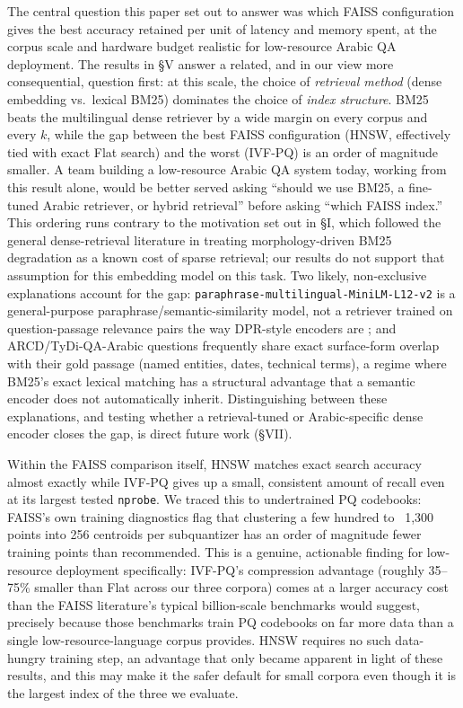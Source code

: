 \documentclass[conference]{IEEEtran}
\begin{document}
The central question this paper set out to answer was which FAISS configuration gives the best accuracy retained per unit of latency and memory spent, at the corpus scale and hardware budget realistic for low-resource Arabic QA deployment. The results in \S V answer a related, and in our view more consequential, question first: at this scale, the choice of \emph{retrieval method} (dense embedding vs.\ lexical BM25) dominates the choice of \emph{index structure}. BM25 beats the multilingual dense retriever by a wide margin on every corpus and every $k$, while the gap between the best FAISS configuration (HNSW, effectively tied with exact Flat search) and the worst (IVF-PQ) is an order of magnitude smaller. A team building a low-resource Arabic QA system today, working from this result alone, would be better served asking ``should we use BM25, a fine-tuned Arabic retriever, or hybrid retrieval'' before asking ``which FAISS index.'' This ordering runs contrary to the motivation set out in \S I, which followed the general dense-retrieval literature \cite{karpukhin2020dense} in treating morphology-driven BM25 degradation as a known cost of sparse retrieval; our results do not support that assumption for this embedding model on this task. Two likely, non-exclusive explanations account for the gap: \texttt{paraphrase-multilingual-MiniLM-L12-v2} is a general-purpose paraphrase/semantic-similarity model, not a retriever trained on question-passage relevance pairs the way DPR-style encoders are \cite{karpukhin2020dense}; and ARCD/TyDi-QA-Arabic questions frequently share exact surface-form overlap with their gold passage (named entities, dates, technical terms), a regime where BM25's exact lexical matching has a structural advantage that a semantic encoder does not automatically inherit. Distinguishing between these explanations, and testing whether a retrieval-tuned or Arabic-specific dense encoder closes the gap, is direct future work (\S VII).

Within the FAISS comparison itself, HNSW matches exact search accuracy almost exactly while IVF-PQ gives up a small, consistent amount of recall even at its largest tested \texttt{nprobe}. We traced this to undertrained PQ codebooks: FAISS's own training diagnostics flag that clustering a few hundred to ~1,300 points into 256 centroids per subquantizer has an order of magnitude fewer training points than recommended. This is a genuine, actionable finding for low-resource deployment specifically: IVF-PQ's compression advantage (roughly 35--75\% smaller than Flat across our three corpora) comes at a larger accuracy cost than the FAISS literature's typical billion-scale benchmarks would suggest, precisely because those benchmarks train PQ codebooks on far more data than a single low-resource-language corpus provides. HNSW requires no such data-hungry training step, an advantage that only became apparent in light of these results, and this may make it the safer default for small corpora even though it is the largest index of the three we evaluate.
\end{document}
